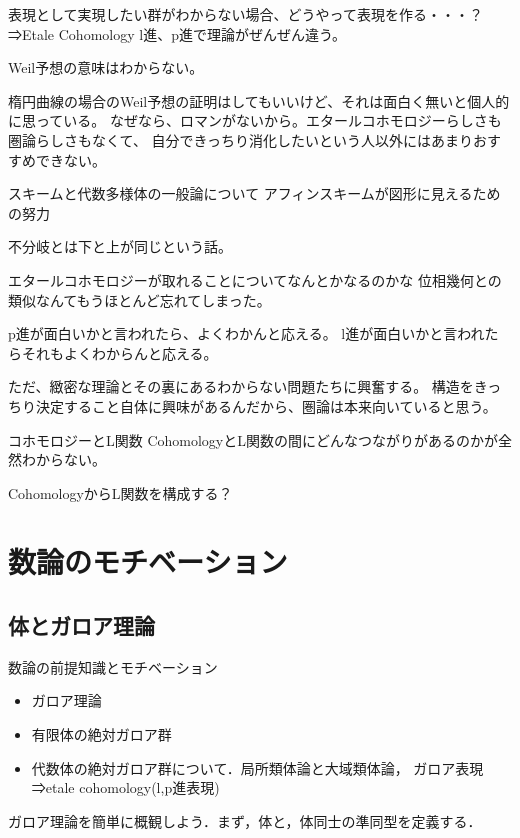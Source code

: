 \documentclass{ujarticle}
\begin{document}
表現として実現したい群がわからない場合、どうやって表現を作る・・・？
⇒Etale Cohomology
l進、p進で理論がぜんぜん違う。

Weil予想の意味はわからない。

楕円曲線の場合のWeil予想の証明はしてもいいけど、それは面白く無いと個人的に思っている。
なぜなら、ロマンがないから。エタールコホモロジーらしさも圏論らしさもなくて、
自分できっちり消化したいという人以外にはあまりおすすめできない。

スキームと代数多様体の一般論について
アフィンスキームが図形に見えるための努力

不分岐とは下と上が同じという話。

エタールコホモロジーが取れることについてなんとかなるのかな
位相幾何との類似なんてもうほとんど忘れてしまった。

p進が面白いかと言われたら、よくわかんと応える。
l進が面白いかと言われたらそれもよくわからんと応える。

ただ、緻密な理論とその裏にあるわからない問題たちに興奮する。
構造をきっちり決定すること自体に興味があるんだから、圏論は本来向いていると思う。

コホモロジーとL関数
CohomologyとL関数の間にどんなつながりがあるのかが全然わからない。

CohomologyからL関数を構成する？

\section{数論のモチベーション}
\label{sec:数論のモチベーション}

\subsection{体とガロア理論}
\label{subs:体とガロア理論}
数論の前提知識とモチベーション
\begin{itemize}
  \setlength{\parskip}{0cm} %
  \setlength{\itemsep}{0cm} %
  \item ガロア理論
  \item 有限体の絶対ガロア群
  \item 代数体の絶対ガロア群について．局所類体論と大域類体論，
  ガロア表現⇒etale cohomology(l,p進表現)
\end{itemize}

ガロア理論を簡単に概観しよう．まず，体と，体同士の準同型を定義する．
\end{document}
